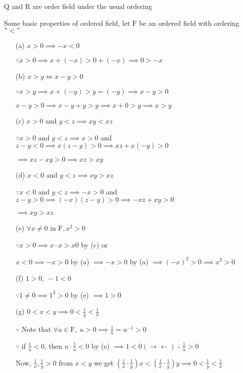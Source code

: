 \begin{ex*}
	$\mathrm{Q}$ and $\mathrm{R}$ are order field under the usual ordering
	
	Some basic properties of ordered field, let $\mathrm{F}$ be an ordered field with ordering $"<"$
	
	\begin{enumerate}
		\item[(a)] $x > 0 \implies -x <0$
		
		$\because x > 0 \implies x + (-x) > 0 + (-x) \implies 0 > -x$
		
		\item[(b)] $x>y \Leftrightarrow x-y >0$
		
		$\because x > y \implies x + (-y)>y = (-y) \implies x-y >0$
		
		$x-y > 0 \implies x-y+y > y \implies x + 0 > y \implies x > y$
		\item[(c)] $x >0 $ and $y<z \implies xy < xz$
		
		$\because x > 0 $ and $y < z \implies x>0$ and $z-y <0 \implies x(z-y)>0 \implies xz+x(-y) >0$
		
		$\implies xz - xy > 0 \implies xz > xy$
		
		\item[(d)] $x < 0 $ and $y < z \implies xy > xz$
		
		$\because x<0$ and $y<z \implies -x > 0 $ and $z-y > 0 \implies (-x)(z - y)> 0\implies -xz+xy > 0$
		
		$\implies xy > xz$ 
		
		\item[(e)] $\forall x \neq 0$ in $\mathrm{F}, x^2 > 0$
		
		$\because x > 0 \implies x \cdot x > x0$ by (c) or
		
		$x<0 \implies -x >0$ by (a) $\implies -x > 0$ by (a) $\implies (-x)^2 > 0 \implies x^2 > 0$ 
		\item[(f)] $1 > 0,~-1<0$
		
		$\because 1 \neq 0 \implies 1^2 > 0$ by (e) $\implies 1 >0$
		\item[(g)] $0<x<y \implies 0 < \frac{1}{y} < \frac{1}{x}$
		
		$\because$ Note that $\forall u \in \mathrm{F},~u>0 \implies \frac{1}{u} = u^{-1} > 0$
		
		$\because$ if $\frac{1}{u}<0$, then $u\cdot \frac{1}{u} < 0$ by (e) $\implies 1 < 0 (\rightarrow\leftarrow)~\therefore~\frac{1}{u}>0$
		
		Now, $\frac{1}{x},\frac{1}{y}>0$ from $x<y$ we get $(\frac{1}{x}\cdot\frac{1}{y})x < (\frac{1}{x}\cdot \frac{1}{y})y \implies 0 < \frac{1}{y} <\frac{1}{x}$
	\end{enumerate}  
\end{ex*}

